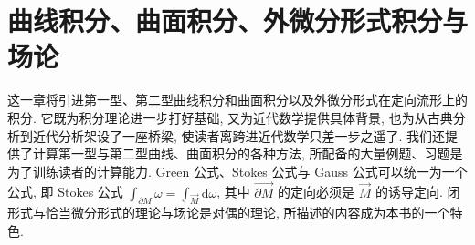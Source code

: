 
\chapter{曲线积分、曲面积分、外微分形式积分与场论}\label{ch:11}

这一章将引进第一型、第二型曲线积分和曲面积分以及外微分形式在定向流形上的积分. 它既为积分理论进一步打好基础, 又为近代数学提供具体背景, 也为从古典分析到近代分析架设了一座桥梁, 使读者离跨进近代数学只差一步之遥了. 我们还提供了计算第一型与第二型曲线、曲面积分的各种方法, 所配备的大量例题、习题是为了训练读者的计算能力. Green 公式、Stokes 公式与 Gauss 公式可以统一为一个公式, 即 Stokes 公式 $\int_{\partial M}\omega=\int_{\overrightarrow{M}}\mathrm{d}\omega$, 其中 $\overrightarrow{\partial M}$ 的定向必须是 $\overrightarrow{M}$ 的诱导定向. 闭形式与恰当微分形式的理论与场论是对偶的理论, 所描述的内容成为本书的一个特色.









